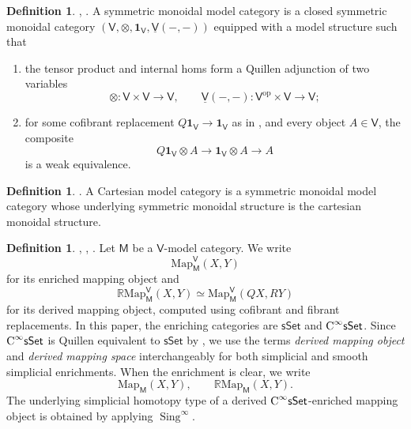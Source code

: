 \documentclass{amsart}
\newcommand{\cat}[1]{\mathsf{#1}}
\newcommand{\sset}{\cat{sSet}}
\DeclareMathOperator{\Sing}{Sing}
\newcommand{\unit}{\mathbf{1}}
\newcommand{\CsSet}{\textnormal{C}^{\infty}\sset}
\newcommand{\Map}{\mathrm{Map}}
\renewcommand{\op}{\mathrm{op}}
\theoremstyle{definition}
\newtheorem{definition}[equation]{Definition}
\numberwithin{equation}{subsection}
\numberwithin{subsubsection}{subsection}
\begin{document}
\begin{definition}\label{def:symmetric.monoidal.model.category}
  \textnormal{\cite[Definition~4.2.6]{Hov99}},
  \textnormal{\cite[Definition~1.27.2]{Bar10}}.
  A symmetric monoidal model category is a closed symmetric monoidal category
  \((\cat{V},\otimes,\unit_{\cat{V}},\underline{\cat{V}}(-,-))\) equipped
  with a model structure such that
  \begin{enumerate}
    \item the tensor product and internal homs form a Quillen adjunction
      of two variables
      \[
        \otimes:\cat{V}\times\cat{V}\to\cat{V},
        \qquad
        \underline{\cat{V}}(-,-):\cat{V}^{\op}\times\cat{V}\to\cat{V};
      \]
    \item for some cofibrant replacement \(Q\unit_{\cat{V}}\to\unit_{\cat{V}}\)
      as in , and every object
      \(A\in\cat{V}\), the composite
      \[
        Q\unit_{\cat{V}}\otimes A
        \longrightarrow
        \unit_{\cat{V}}\otimes A
        \longrightarrow
        A
      \]
      is a weak equivalence.
  \end{enumerate}
\end{definition}

\begin{definition}\label{def:Cartesian.model.category}
  \textnormal{\cite[Definition~1.27.3]{Bar10}}.
  A Cartesian model category is a symmetric monoidal model category whose
  underlying symmetric monoidal structure is the cartesian
  monoidal structure.
\end{definition}

\begin{definition}\label{def:derived.mapping.space}
  \textnormal{\cite[Theorem 5.4.9]{Hov99}},
  \textnormal{\cite[Section 17.4]{Hir03}},
  \textnormal{\cite[Definition 1.35]{Bar10}}.
  Let \(\cat{M}\) be a \(\cat{V}\)-model category. We write
  \[
    \Map_{\cat{M}}^{\cat{V}}(X,Y)
  \]
  for its enriched mapping object and
  \[
    \mathbb{R}\Map_{\cat{M}}^{\cat{V}}(X,Y)
    \simeq
    \Map_{\cat{M}}^{\cat{V}}(QX,RY)
  \]
  for its derived mapping object, computed using cofibrant and fibrant
  replacements. In this paper, the enriching categories are \(\sset\) and
  \(\CsSet\). Since \(\CsSet\) is Quillen equivalent to \(\sset\) by
  , we use the terms
  \emph{derived mapping object} and \emph{derived mapping space} interchangeably
  for both simplicial and smooth simplicial enrichments. When the enrichment is
  clear, we write
  \[
    \Map_{\cat{M}}(X,Y),
    \qquad
    \mathbb{R}\Map_{\cat{M}}(X,Y).
  \]
  The underlying simplicial homotopy type of a derived
  \(\CsSet\)-enriched mapping object is obtained by applying
  \(\Sing^\infty\).
\end{definition}
\end{document}
